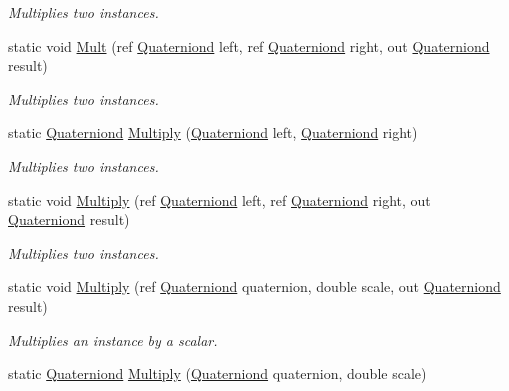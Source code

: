 \begin{DoxyCompactItemize}
\begin{DoxyCompactList}\small\item\em Multiplies two instances. \end{DoxyCompactList}\item 
static void \hyperlink{struct_open_t_k_1_1_quaterniond_a318fad702cef759b99e1b095b37fe6ee}{Mult} (ref \hyperlink{struct_open_t_k_1_1_quaterniond}{Quaterniond} left, ref \hyperlink{struct_open_t_k_1_1_quaterniond}{Quaterniond} right, out \hyperlink{struct_open_t_k_1_1_quaterniond}{Quaterniond} result)
\begin{DoxyCompactList}\small\item\em Multiplies two instances. \end{DoxyCompactList}\item 
static \hyperlink{struct_open_t_k_1_1_quaterniond}{Quaterniond} \hyperlink{struct_open_t_k_1_1_quaterniond_a3ee0fa11b125b3e9e02c2cfe8f1bca4c}{Multiply} (\hyperlink{struct_open_t_k_1_1_quaterniond}{Quaterniond} left, \hyperlink{struct_open_t_k_1_1_quaterniond}{Quaterniond} right)
\begin{DoxyCompactList}\small\item\em Multiplies two instances. \end{DoxyCompactList}\item 
static void \hyperlink{struct_open_t_k_1_1_quaterniond_af0a96f3005b5af22b2779312b4a8c6ae}{Multiply} (ref \hyperlink{struct_open_t_k_1_1_quaterniond}{Quaterniond} left, ref \hyperlink{struct_open_t_k_1_1_quaterniond}{Quaterniond} right, out \hyperlink{struct_open_t_k_1_1_quaterniond}{Quaterniond} result)
\begin{DoxyCompactList}\small\item\em Multiplies two instances. \end{DoxyCompactList}\item 
static void \hyperlink{struct_open_t_k_1_1_quaterniond_a755595d84d818b7d81206054e76bf971}{Multiply} (ref \hyperlink{struct_open_t_k_1_1_quaterniond}{Quaterniond} quaternion, double scale, out \hyperlink{struct_open_t_k_1_1_quaterniond}{Quaterniond} result)
\begin{DoxyCompactList}\small\item\em Multiplies an instance by a scalar. \end{DoxyCompactList}\item 
static \hyperlink{struct_open_t_k_1_1_quaterniond}{Quaterniond} \hyperlink{struct_open_t_k_1_1_quaterniond_ac9cb66160a4fd9f729f0f57808cde218}{Multiply} (\hyperlink{struct_open_t_k_1_1_quaterniond}{Quaterniond} quaternion, double scale)

\end{DoxyCompactItemize}
